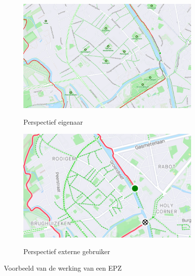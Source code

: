 \begin{figure}[h]
    \centering
    \begin{subfigure}[b]{.7\textwidth}
        \centering
        \caption{Perspectief eigenaar}
        \includegraphics[width=1\textwidth]{fig/EPZ-mechanisme/Example_EPZ_InternalView.png}\label{fig:EPZ_internal}
    \end{subfigure}\hfill
    \begin{subfigure}[b]{.7\textwidth}
        \centering
        \caption{Perspectief externe gebruiker}
        \includegraphics[width=1\textwidth]{fig/EPZ-mechanisme/Example_EPZ_ExternalView.png}\label{fig:EPZ_external}
    \end{subfigure}
    \caption{Voorbeeld van de werking van een EPZ}\label{fig:EPZ_Voorbeeld}
\end{figure}

